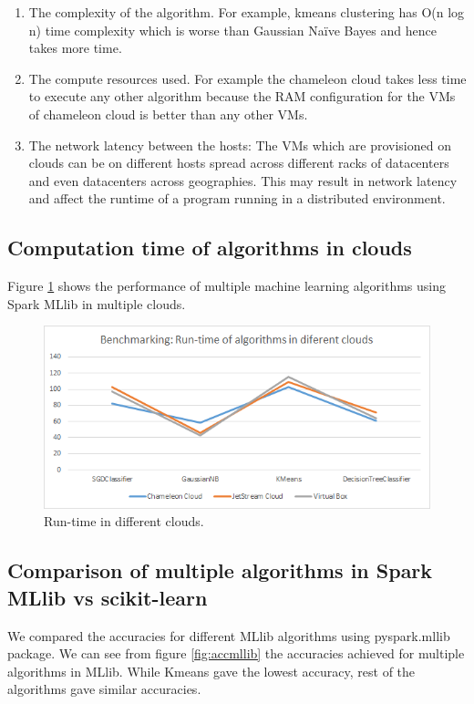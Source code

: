 \documentclass[9pt,twocolumn,twoside]{../../styles/osajnl}
\begin{document}
\begin{enumerate}
 \item The complexity of the algorithm. For example,  kmeans clustering has  O(n log n) time complexity which is worse than Gaussian Naïve Bayes and hence takes more time.
 \item The compute resources used.  For example the chameleon cloud takes less time to execute any other algorithm because the RAM configuration for the VMs of chameleon cloud is better than any other VMs.
 \item The network latency between the hosts: The VMs which are provisioned on clouds can be on different hosts spread across different racks of datacenters and even datacenters across geographies. This may result in network latency and affect the runtime of a program running in a distributed environment.
\end{enumerate}

\subsection{Computation time of algorithms in clouds}
Figure \ref{fig:bench} shows the performance of multiple machine learning algorithms using Spark MLlib in multiple clouds.
\begin{figure}[h]
\centering
\includegraphics[scale=0.85]{images/Benchmarking}
\caption{Run-time in different clouds.}
\label{fig:bench}
\end{figure}

\subsection{Comparison of multiple algorithms in Spark MLlib vs scikit-learn}


We compared the accuracies for different MLlib algorithms using pyspark.mllib package. We can see from figure \ref{fig:accmllib} the accuracies achieved for multiple algorithms in MLlib. While Kmeans gave the lowest accuracy, rest of the algorithms gave similar accuracies.
\end{document}
